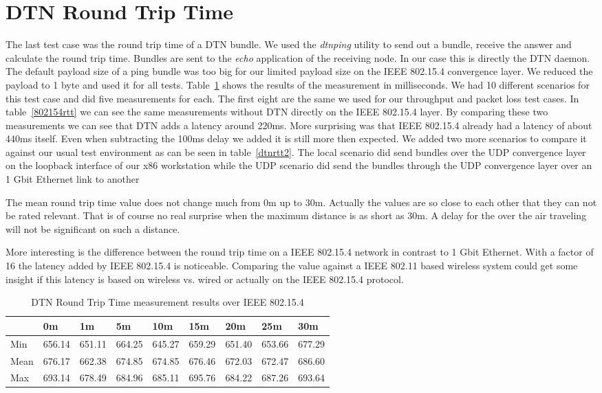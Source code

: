 \section{DTN Round Trip Time}
The last test case was the round trip time of a DTN bundle. We used the
\emph{dtnping} utility to send out a bundle, receive the answer and calculate
the round trip time. Bundles are sent to the \emph{echo} application of the
receiving node. In our case this is directly the DTN daemon. The default payload
size of a ping bundle was too big for our limited payload size on the IEEE
802.15.4 convergence layer. We reduced the payload to 1 byte and used it for all
tests. Table~\ref{dtnrtt} shows the results of the measurement in milliseconds. We
had 10 different scenarios for this test case and did five measurements for each.
The first eight are the same we used for our throughput and packet loss test cases.
In table~\ref{802154rtt} we can see the same measurements without DTN directly on
the IEEE 802.15.4 layer. By comparing these two measurements we can see that DTN
adds a latency around 220ms. More surprising was that IEEE 802.15.4 already had
a latency of about 440ms itself. Even when subtracting the 100ms delay we added
it is still more then expected. We added two more scenarios to compare it against
our usual test environment as can be seen in table~\ref{dtnrtt2}. The
local scenario did send bundles over the UDP convergence layer on the loopback
interface of our x86 workstation while the UDP scenario did send the bundles
through the UDP convergence layer over an 1 Gbit Ethernet link to another

The mean round trip time value does not change much from 0m up to 30m. Actually
the values are so close to each other that they can not be rated relevant. That
is of course no real surprise when the maximum distance is as short as 30m. A
delay for the over the air traveling will not be significant on such a distance.

More interesting is the difference between the round trip time on a IEEE
802.15.4 network in contrast to 1 Gbit Ethernet. With a factor of 16 the latency
added by IEEE 802.15.4 is noticeable. Comparing the value against a
IEEE 802.11 based wireless system could get some insight if this latency is based
on wireless vs. wired or actually on the IEEE 802.15.4 protocol.

\begin{table}
\begin{tabular}{lllllllll}
    & 0m & 1m & 5m & 10m & 15m & 20m & 25m & 30m \\
\hline
Min & 656.14 & 651.11 & 664.25 & 645.27 & 659.29 & 651.40 & 653.66 & 677.29 \\
Mean & 676.17 & 662.38 & 674.85 & 674.85 & 676.46 & 672.03 & 672.47 & 686.60 \\
Max & 693.14 & 678.49 & 684.96 & 685.11 & 695.76 & 684.22 & 687.26 & 693.64 \\
\end{tabular}
\caption{DTN Round Trip Time measurement results over IEEE 802.15.4}
\label{dtnrtt}
\end{table}

